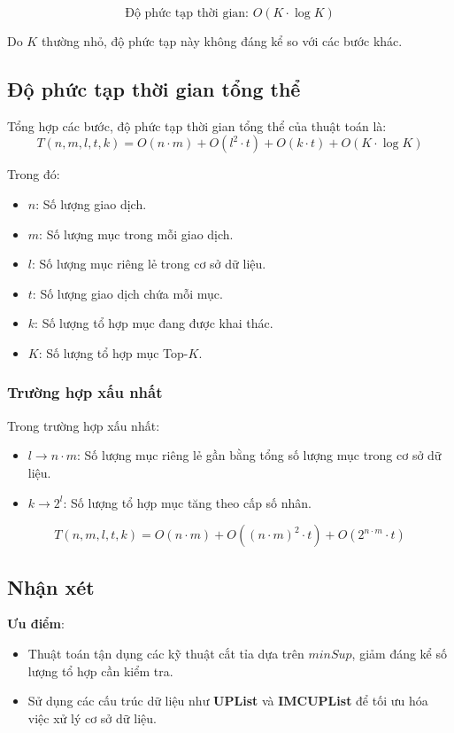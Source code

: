 \documentclass[conference]{IEEEtran}
\begin{document}
\[
\text{Độ phức tạp thời gian: } O(K \cdot \log K)
\]

Do \(K\) thường nhỏ, độ phức tạp này không đáng kể so với các bước khác.

\subsection{Độ phức tạp thời gian tổng thể}
Tổng hợp các bước, độ phức tạp thời gian tổng thể của thuật toán là:
\[
T(n, m, l, t, k) = O(n \cdot m) + O(l^2 \cdot t) + O(k \cdot t) + O(K \cdot \log K)
\]

Trong đó:
\begin{itemize}
    \item \(n\): Số lượng giao dịch.
    \item \(m\): Số lượng mục trong mỗi giao dịch.
    \item \(l\): Số lượng mục riêng lẻ trong cơ sở dữ liệu.
    \item \(t\): Số lượng giao dịch chứa mỗi mục.
    \item \(k\): Số lượng tổ hợp mục đang được khai thác.
    \item \(K\): Số lượng tổ hợp mục Top-\(K\).
\end{itemize}

\subsubsection{Trường hợp xấu nhất}
Trong trường hợp xấu nhất:
\begin{itemize}
    \item \(l \to n \cdot m\): Số lượng mục riêng lẻ gần bằng tổng số lượng mục trong cơ sở dữ liệu.
    \item \(k \to 2^l\): Số lượng tổ hợp mục tăng theo cấp số nhân.
\end{itemize}

\[
T(n, m, l, t, k) = O(n \cdot m) + O((n \cdot m)^2 \cdot t) + O(2^{n \cdot m} \cdot t)
\]

\subsection{Nhận xét}
\textbf{Ưu điểm}:
\begin{itemize}
    \item Thuật toán tận dụng các kỹ thuật cắt tỉa dựa trên \(minSup\), giảm đáng kể số lượng tổ hợp cần kiểm tra.
    \item Sử dụng các cấu trúc dữ liệu như \textbf{UPList} và \textbf{IMCUPList} để tối ưu hóa việc xử lý cơ sở dữ liệu.
\end{itemize}
\end{document}
